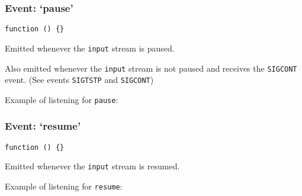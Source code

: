 \begin{Shaded}
\begin{Highlighting}[]
\NormalTok{(}\NormalTok{, } 
  \NormalTok{(}
\NormalTok{\});}
\end{Highlighting}
\end{Shaded}

\subsubsection{Event: `pause'}\label{event-pause}

\texttt{function () \{\}}

Emitted whenever the \texttt{input} stream is paused.

Also emitted whenever the \texttt{input} stream is not paused and
receives the \texttt{SIGCONT} event. (See events \texttt{SIGTSTP} and
\texttt{SIGCONT})

Example of listening for \texttt{pause}:

\begin{Shaded}
\begin{Highlighting}[]
\NormalTok{(}\NormalTok{, }\NormalTok{() \{}
  \NormalTok{(}\NormalTok{);}
\NormalTok{\});}
\end{Highlighting}
\end{Shaded}

\subsubsection{Event: `resume'}\label{event-resume}

\texttt{function () \{\}}

Emitted whenever the \texttt{input} stream is resumed.

Example of listening for \texttt{resume}:

\begin{Shaded}
\begin{Highlighting}[]
\NormalTok{(}\NormalTok{, }\NormalTok{() \{}
  \NormalTok{(}\NormalTok{);}
\NormalTok{\});}
\end{Highlighting}
\end{Shaded}

